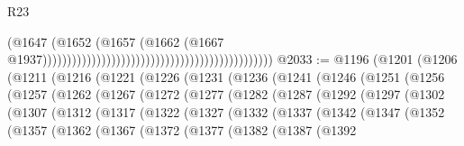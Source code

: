 \begin{lexlean}{R23}
\begin{coremodule}
                                                                                        (@1647
                                                                                          (@1652
                                                                                            (@1657
                                                                                              (@1662
                                                                                                (@1667
                                                                                                  @1937)))))))))))))))))))))))))))))))))))))))))))))))
@2033 := @1196
    (@1201
      (@1206
        (@1211
          (@1216
            (@1221
              (@1226
                (@1231
                  (@1236
                    (@1241
                      (@1246
                        (@1251
                          (@1256
                            (@1257
                              (@1262
                                (@1267
                                  (@1272
                                    (@1277
                                      (@1282
                                        (@1287
                                          (@1292
                                            (@1297
                                              (@1302
                                                (@1307
                                                  (@1312
                                                    (@1317
                                                      (@1322
                                                        (@1327
                                                          (@1332
                                                            (@1337
                                                              (@1342
                                                                (@1347
                                                                  (@1352
                                                                    (@1357
                                                                      (@1362
                                                                        (@1367
                                                                          (@1372
                                                                            (@1377
                                                                              (@1382
                                                                                (@1387
                                                                                  (@1392

\end{coremodule}
\end{lexlean}
